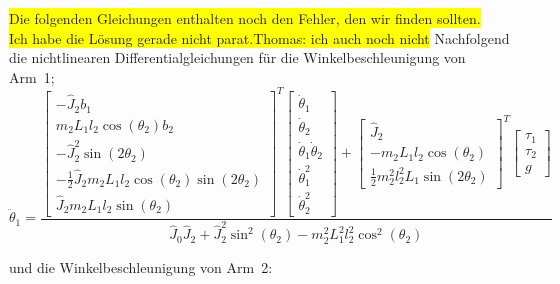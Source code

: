 \colorbox{yellow}{Die folgenden Gleichungen enthalten noch den Fehler, den wir finden sollten.} \\
\colorbox{yellow}{Ich habe die Lösung gerade nicht parat.Thomas: ich auch noch nicht}
Nachfolgend die nichtlinearen Differentialgleichungen für die Winkelbeschleunigung von Arm~1;
\begin{equation}
\ddot{\theta}_1 =
\frac{
\begin{bmatrix}
-\hat{J}_2b_1 \\ 
m_2L_1l_2\cos(\theta_2)b_2 \\ 
-\hat{J}^2_2\sin(2\theta_2) \\ 
-\frac{1}{2}\hat{J}_2m_2L_1l_2\cos(\theta_2)\sin(2\theta_2) \\ 
\hat{J}_2m_2L_1l_2\sin(\theta_2)
\end{bmatrix}^T
\begin{bmatrix}
\dot{\theta}_1 \\ 
\dot{\theta}_2 \\ 
\dot{\theta}_1\dot{\theta}_2 \\ 
\dot{\theta}^2_1 \\ 
\dot{\theta}^2_2
\end{bmatrix}
+
\begin{bmatrix}
\hat{J}_2 \\ 
-m_2L_1l_2\cos(\theta_2) \\ 
\frac{1}{2}m^2_2l^2_2L_1\sin(2\theta_2)
\end{bmatrix}^T
\begin{bmatrix}
\tau_1 \\ 
\tau_2 \\ 
g
\end{bmatrix} }
{\hat{J}_0\hat{J}_2+\hat{J}^2_2\sin^2(\theta_2)-m^2_2L^2_1l^2_2\cos^2(\theta_2)}
\end{equation}

und die Winkelbeschleunigung von Arm~2:

